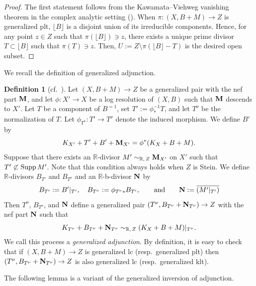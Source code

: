 \documentclass[12pt]{amsart}
\theoremstyle{definition}
\newtheorem{defn}[thm]{Definition}
\begin{document}
\begin{proof}
The first statement follows from the Kawamata--Viehweg vanishing theorem in the complex analytic setting (\cite[II, 5.12 Corollary]{nakayama}). 
When $\pi \colon (X,B+M) \to Z$ is generalized plt, $\lfloor B\rfloor$ is a disjoint union of its irreducible components. 
Hence, for any point $z \in Z$ such that $\pi(\lfloor B\rfloor) \ni z$, there exists a unique prime divisor $T \subset \lfloor B\rfloor$ such that $\pi(T) \ni z$. 
Then, $U:=Z\setminus \pi(\lfloor B\rfloor-T)$ is the desired open subset. 
\end{proof}


We recall the definition of generalized adjunction. 

\begin{defn}[cf.~{\cite[Definition 4.7]{bz}}]\label{defn--gen-adjunction}
Let $(X,B+M)\to Z$ be a generalized pair with the nef part $\boldsymbol{\rm M}$, and let $\phi \colon X' \to X$ be a log resolution of $(X,B)$ such that $\boldsymbol{\rm M}$ descends to $X'$. 
Let $T$ be a component of $B^{=1}$, set $T':=\phi_{*}^{-1}T$, and let $T^{\nu}$ be the normalization of $T$. 
Let $\phi_{T^{\nu}} \colon T' \to T^{\nu}$ denote the induced morphism. 
We define $B'$ by 
$$K_{X'}+T'+B'+\boldsymbol{\rm M}_{X'}=\phi^{*}(K_{X}+B+M).$$
Suppose that there exists an $\mathbb{R}$-divisor $M' \sim_{\mathbb{R},\,Z}\boldsymbol{\rm M}_{X'}$ on $X'$ such that $T' \not\subset {\rm Supp}\,M'$. 
Note that this condition always holds when $Z$ is Stein. 
We define $\mathbb{R}$-divisors $B_{T'}$ and $B_{T^{\nu}}$ and an $\mathbb{R}$-b-divisor $\boldsymbol{\rm N}$ by
\begin{equation*}
B_{T'}:=B'|_{T'},\quad B_{T^{\nu}}:=\phi_{T^{\nu}*}B_{T'}, \qquad {\rm and}\qquad \boldsymbol{\rm N}:=\overline{(M'|_{T'})} 
\end{equation*}
Then $T^{\nu}$, $B_{T^{\nu}}$, and $\boldsymbol{\rm N}$ define a generalized pair $(T^{\nu}, B_{T^{\nu}}+\boldsymbol{\rm N}_{T^{\nu}}) \to Z$ with the nef part $\boldsymbol{\rm N}$ such that
$$K_{T^{\nu}}+B_{T^{\nu}}+\boldsymbol{\rm N}_{T^{\nu}} \sim_{\mathbb{R},\,Z}(K_{X}+B+M)|_{T^{\nu}}.$$ 
We call this process a {\em generalized adjunction}. 
By definition, it is easy to check that if $(X,B+M)\to Z$ is generalized lc (resp.~generalized plt) then $(T^{\nu}, B_{T^{\nu}}+\boldsymbol{\rm N}_{T^{\nu}}) \to Z$ is also generalized lc (resp.~generalized klt). 
\end{defn}



The following lemma is a variant of the generalized inversion of adjunction. 
\end{document}
